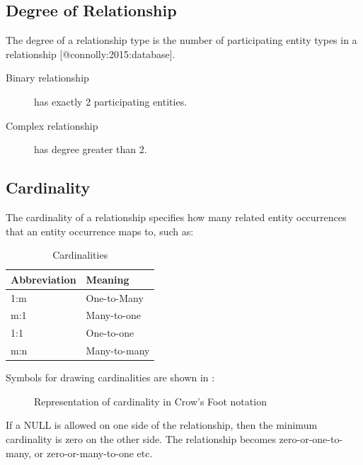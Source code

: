 \documentclass[slides]{pgnotes}
\begin{document}
\subsection{Degree of Relationship}\label{degree-of-relationship}

The degree of a relationship type is the number of participating entity
types in a relationship {[}@connolly:2015:database{]}.

\begin{description}
\item[Binary relationship]
has exactly 2 participating entities.
\item[Complex relationship]
has degree greater than 2.
\end{description}

\subsection{Cardinality}\label{cardinality}

The cardinality of a relationship specifies how many related entity
occurrences that an entity occurrence maps to, such as:

\begin{table}[htbp]
  \centering
  \begin{tabular}{l l}
    \toprule
    \textbf{Abbreviation} & \textbf{Meaning}\\
    \midrule
    1:m & One-to-Many\\
    m:1 & Many-to-one\\
    1:1 & One-to-one\\
    m:n & Many-to-many\\
    \bottomrule
  \end{tabular}
  \caption{Cardinalities}
  \label{tab:cardinalities}
\end{table}

Symbols for drawing cardinalities are shown in :

\begin{figure}[htbp]
\centering
\caption{Representation of cardinality in Crow's Foot notation{}}
\end{figure}

If a NULL is allowed on one side of the relationship, then the minimum
cardinality is zero on the other side. The relationship becomes
zero-or-one-to-many, or zero-or-many-to-one etc.

\begin{figure}[htbp]
\centering
\end{figure}
\end{document}
